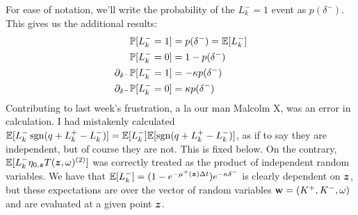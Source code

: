 For ease of notation, we'll write the probability of the $L_k^- = 1$ event as $p(\delta^-)$. This gives us the additional results:
\begin{align*}
\mathbb{P} [ L_k^- = 1] & = p(\delta^-) = \mathbb{E} [ L_k^-] \\
\mathbb{P} [ L_k^- = 0] & = 1 - p(\delta^-) \\
\partial_{\delta^-} \mathbb{P} [ L_k^- = 1]  & = -\kappa p(\delta^-) \\
\partial_{\delta^-} \mathbb{P} [ L_k^- = 0] & = \kappa p(\delta^-) \\
\end{align*}
Contributing to last week's frustration, a la our man Malcolm X, was an error in calculation. I had mistakenly calculated $\mathbb{E} [ L_k^- \operatorname{\mathrm{sgn}}(q + L_k^+ - L_k^-)] = \mathbb{E} [ L_k^-] \mathbb{E}[\operatorname{\mathrm{sgn}}(q + L_k^+ - L_k^-)]$, as if to say they are independent, but of course they are not. This is fixed below. On the contrary, $\mathbb{E} [ L_k^- \eta_{0,\bm{z}}T(\bm{z},\omega)^{(2)}]$ was correctly treated as the product of independent random variables. We have that $\mathbb{E}[L_k^-] = ( 1 - e^{-\mu^+ (\bm{z}) \Delta t} ) e^{-\kappa \delta^-}$ is clearly dependent on $\bm{z}$, but these expectations are over the vector of random variables $\mathbf{w} = (K^+, K^-, \omega)$ and are evaluated at a given point $\bm{z}$.

